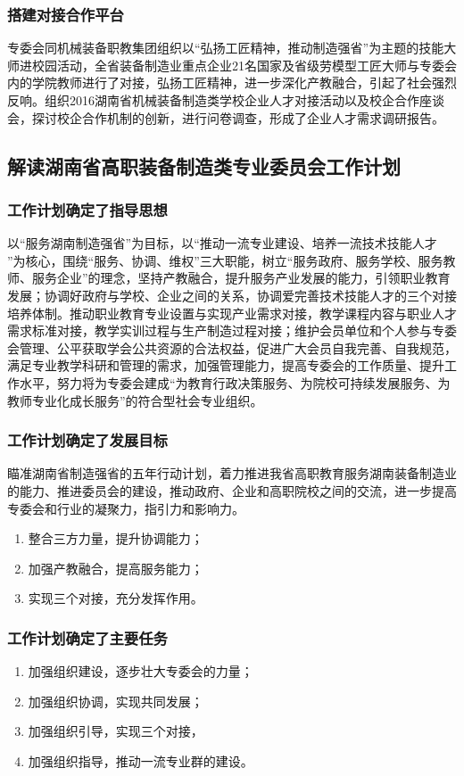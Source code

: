\documentclass[UTF8,zihao=-4]{ctexart}
\begin{document}
\subsubsection{搭建对接合作平台}
专委会同机械装备职教集团组织以“弘扬工匠精神，推动制造强省”为主题的技能大师进校园活动，全省装备制造业重点企业21名国家及省级劳模型工匠大师与专委会内的学院教师进行了对接，弘扬工匠精神，进一步深化产教融合，引起了社会强烈反响。组织2016湖南省机械装备制造类学校企业人才对接活动以及校企合作座谈会，探讨校企合作机制的创新，进行问卷调查，形成了企业人才需求调研报告。
\subsection{解读湖南省高职装备制造类专业委员会工作计划}
\subsubsection{工作计划确定了指导思想}
以“服务湖南制造强省”为目标，以“推动一流专业建设、培养一流技术技能人才
”为核心，围绕“服务、协调、维权”三大职能，树立“服务政府、服务学校、服务教师、服务企业”的理念，坚持产教融合，提升服务产业发展的能力，引领职业教育发展；协调好政府与学校、企业之间的关系，协调爱完善技术技能人才的三个对接培养体制。推动职业教育专业设置与实现产业需求对接，教学课程内容与职业人才需求标准对接，教学实训过程与生产制造过程对接；维护会员单位和个人参与专委会管理、公平获取学会公共资源的合法权益，促进广大会员自我完善、自我规范，满足专业教学科研和管理的需求，加强管理能力，提高专委会的工作质量、提升工作水平，努力将为专委会建成“为教育行政决策服务、为院校可持续发展服务、为教师专业化成长服务”的符合型社会专业组织。
\subsubsection{工作计划确定了发展目标}
瞄准湖南省制造强省的五年行动计划，着力推进我省高职教育服务湖南装备制造业的能力、推进委员会的建设，推动政府、企业和高职院校之间的交流，进一步提高专委会和行业的凝聚力，指引力和影响力。
\begin{enumerate}[\hspace{2.5em}A、]
	\item 整合三方力量，提升协调能力；
	\item 加强产教融合，提高服务能力；
	\item 实现三个对接，充分发挥作用。
\end{enumerate}
\subsubsection{工作计划确定了主要任务}
\begin{enumerate}[\hspace{2.5em}A、]
	\item 加强组织建设，逐步壮大专委会的力量；
	\item 加强组织协调，实现共同发展；
	\item 加强组织引导，实现三个对接，
	\item 加强组织指导，推动一流专业群的建设。
\end{enumerate}
\end{document}

